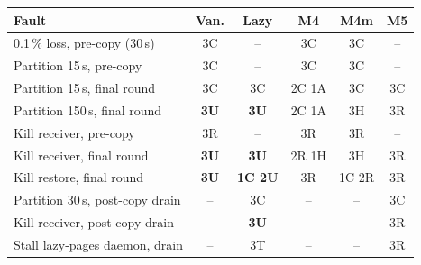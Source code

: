 \begin{tabular}{lccccc}
\toprule
Fault & Van. & Lazy & M4 & M4m & M5 \\
\midrule
0.1\,\% loss, pre-copy (30\,s) & 3C & -- & 3C & 3C & -- \\
Partition 15\,s, pre-copy & 3C & -- & 3C & 3C & -- \\
Partition 15\,s, final round & 3C & 3C & 2C 1A & 3C & 3C \\
Partition 150\,s, final round & \textbf{3U} & \textbf{3U} & 2C 1A & 3H & 3R \\
Kill receiver, pre-copy & 3R & -- & 3R & 3R & -- \\
Kill receiver, final round & \textbf{3U} & \textbf{3U} & 2R 1H & 3H & 3R \\
Kill restore, final round & \textbf{3U} & \textbf{1C 2U} & 3R & 1C 2R & 3R \\
Partition 30\,s, post-copy drain & -- & 3C & -- & -- & 3C \\
Kill receiver, post-copy drain & -- & \textbf{3U} & -- & -- & 3R \\
Stall lazy-pages daemon, drain & -- & 3T & -- & -- & 3R \\
\bottomrule
\end{tabular}
